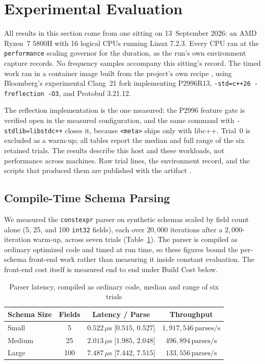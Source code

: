 \section{Experimental Evaluation}

All results in this section come from one sitting on 13~September 2026: an AMD Ryzen~7 5800H with 16 logical CPUs running Linux 7.2.3. Every CPU ran at the \texttt{performance} scaling governor for the duration, as the run's own environment capture records. No frequency samples accompany this sitting's record. The timed work ran in a container image built from the project's own recipe \cite{ctpb2026}, using Bloomberg's experimental Clang~21 fork implementing P2996R13, \texttt{-std=c++26 -freflection -O3}, and Protobuf 3.21.12.

The reflection implementation is the one measured: the P2996 feature gate is verified open in the measured configuration, and the same command with \texttt{-stdlib=libstdc++} closes it, because \texttt{<meta>} ships only with libc++. Trial~0 is excluded as a warm-up; all tables report the median and full range of the six retained trials. The results describe this host and these workloads, not performance across machines. Raw trial lines, the environment record, and the scripts that produced them are published with the artifact \cite{ctpb2026}.

\subsection{Compile-Time Schema Parsing}
We measured the \texttt{constexpr} parser on synthetic schemas scaled by field count alone (5, 25, and 100 \texttt{int32} fields), each over $20{,}000$ iterations after a $2{,}000$-iteration warm-up, across seven trials (Table~\ref{tab:compile_time_results}). The parser is compiled as ordinary optimized code and timed at run time, so these figures bound the per-schema front-end work rather than measuring it inside constant evaluation. The front-end cost itself is measured end to end under Build Cost below.

\begin{table}[ht]
\centering
\caption{Parser latency, compiled as ordinary code, median and range of six trials}
\label{tab:compile_time_results}
\renewcommand{\arraystretch}{1.15}
\setlength{\tabcolsep}{3pt}
\scriptsize
\begin{tabular}{lccc}
\hline
\textbf{Schema Size} & \textbf{Fields} & \textbf{Latency / Parse} & \textbf{Throughput} \\
\hline
Small & 5 & $0.522\,\mu\text{s}$ [$0.515$, $0.527$] & $1{,}917{,}546\,\text{parses/s}$ \\
Medium & 25 & $2.013\,\mu\text{s}$ [$1.985$, $2.048$] & $496{,}894\,\text{parses/s}$ \\
Large & 100 & $7.487\,\mu\text{s}$ [$7.442$, $7.515$] & $133{,}556\,\text{parses/s}$ \\
\hline
\end{tabular}
\end{table}

